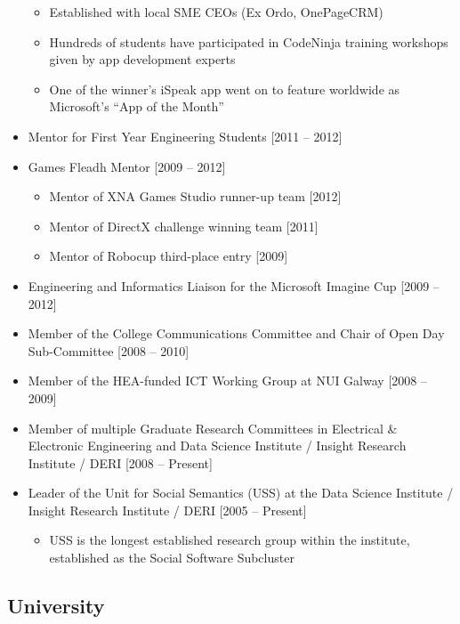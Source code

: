 \documentclass[10pt,a4paper]{res} %
\begin{document}
\begin{resume}
\begin{itemize}
\begin{itemize}
\item Established with local SME CEOs (Ex Ordo, OnePageCRM)
\item Hundreds of students have participated in CodeNinja training workshops given by app development experts
\item One of the winner's iSpeak app went on to feature worldwide as Microsoft's ``App of the Month''
\end{itemize}
\item Mentor for First Year Engineering Students [2011 -- 2012]
\item Games Fleadh Mentor [2009 -- 2012]
\begin{itemize} \itemsep -2pt
\item Mentor of XNA Games Studio runner-up team [2012]
\item Mentor of DirectX challenge winning team [2011] 
\item Mentor of Robocup third-place entry [2009]
\end{itemize}
\item Engineering and Informatics Liaison for the Microsoft Imagine Cup [2009 -- 2012]
\item Member of the College Communications Committee and Chair of Open Day Sub-Committee [2008 -- 2010]
\item Member of the HEA-funded ICT Working Group at NUI Galway [2008 -- 2009]
\item Member of multiple Graduate Research Committees in Electrical \& Electronic Engineering and Data Science Institute / Insight Research Institute / DERI [2008 -- Present]
\item Leader of the Unit for Social Semantics (USS) at the Data Science Institute / Insight Research Institute / DERI [2005 -- Present]
\begin{itemize} \itemsep -2pt
\item USS is the longest established research group within the institute, established as the Social Software Subcluster
\end{itemize}
\end{itemize}

\subsection*{University}


\end{resume}
\end{document}
